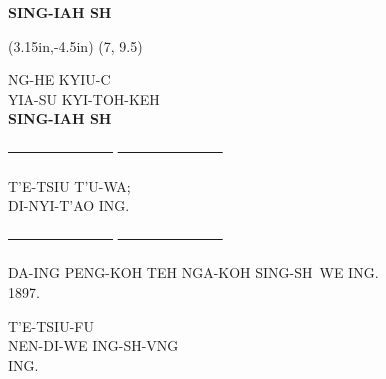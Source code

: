 \begin{titlepage}
	\vspace*{12ex}
	\begin{center}
		{\huge\bfseries\MakeUppercase{Sing-Iah Sh\y}}
	\end{center}
	
	\clearpage
	
	\thisfancyput(3.15in,-4.5in){
		\setlength{\unitlength}{1in}
		\oval(7, 9.5)
	}
	
	\begin{center}
		\MakeUppercase{
			{\Large ng\oo-he kyiu-c\y}			\\[6.5ex]
			{\LARGE yia-su kyi-toh-keh}			\\[7.5ex]
			{\huge\bfseries Sing-Iah Sh\y}		\\
		}
		
		\vfill
		{\Large \sout{~~~~~~~~~~~~~~~}  \sout{~~~~~~~~~~~~~~~}}
		\vfill
		
		\MakeUppercase{
			{\LARGE t'e-tsiu t'u-wa;}			\\[6ex]
			{\large di-nyi-t'ao ing.}			\\
		}
		
		\vfill
		{\Large \sout{~~~~~~~~~~~~~~~}  \sout{~~~~~~~~~~~~~~~}}
		\vfill
		
		\MakeUppercase{
			{\large da-ing peng-koh teh nga-koh sing-sh\y\ we ing. \\[2ex]
					1897.
			}	
		}
	\end{center}
	
	\clearpage
	
	\vspace*{\fill}
	\begin{center}
		\MakeUppercase{
			t'e-tsiu-fu \\
			nen-di-we ing-sh\y-v\oo ng \\
			ing.
		}
	\end{center}
	\vspace*{\fill}
	
\end{titlepage}